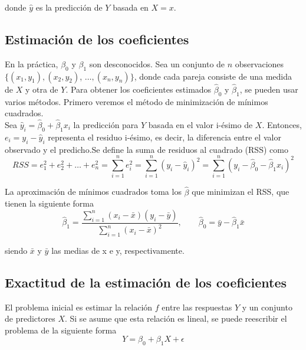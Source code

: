 \noindent donde $\hat{y}$ es la predicción de $Y$ basada en $X = x$.

\subsection{Estimación de los coeficientes}

En la práctica, $\beta_0$ y $\beta_1$ son desconocidos. Sea un conjunto de $n$ observaciones $\{(x_1, y_1), (x_2, y_2)$, \newline $\dots, (x_n, y_n)\}$, donde cada pareja consiste de una medida de $X$ y otra de $Y$. Para obtener los coeficientes estimados $\hat{\beta}_0$ y $\hat{\beta}_1$, se pueden usar varios métodos. Primero veremos el método de minimización de mínimos cuadrados. \\

Sea $\hat{y}_i = \hat{\beta}_0 + \hat{\beta}_1 x_i$ la predicción para $Y$ basada en el valor i-ésimo de $X$. Entonces, $e_i = y_i - \hat{y}_i$ representa el residuo i-ésimo, es decir, la diferencia entre el valor observado y el predicho.Se define la suma de residuos al cuadrado (RSS) como 
\begin{equation}
RSS = e_1^2 + e_2^2 + \dots + e_n^2 = \sum_{i=1}^n e_i^2 = \sum_{i=1}^n (y_i - \hat{y}_i)^2 = \sum_{i=1}^n (y_i - \hat{\beta}_0 - \hat{\beta}_1 x_i)^2
\end{equation}

La aproximación de mínimos cuadrados toma los $\hat{\beta}$ que minimizan el RSS, que tienen la siguiente forma 
\begin{equation}
\hat{\beta}_1 = \frac{\sum_{i=1}^n (x_i - \bar{x})(y_i - \bar{y})}{\sum_{i=1}^n (x_i - \bar{x})^2}, \qquad \hat{\beta}_0 = \bar{y} - \hat{\beta}_1 \bar{x}
\end{equation}

\noindent siendo $\bar{x}$ y $\bar{y}$ las medias de x e y, respectivamente.

\subsection{Exactitud de la estimación de los coeficientes}

El problema inicial es estimar la relación $f$ entre las respuestas $Y$ y un conjunto de predictores $X$. Si se asume que esta relación es lineal, se puede reescribir el problema de la siguiente forma
\begin{equation}
Y = \beta_0 + \beta_1 X + \epsilon \label{eq:3.5}
\end{equation}

